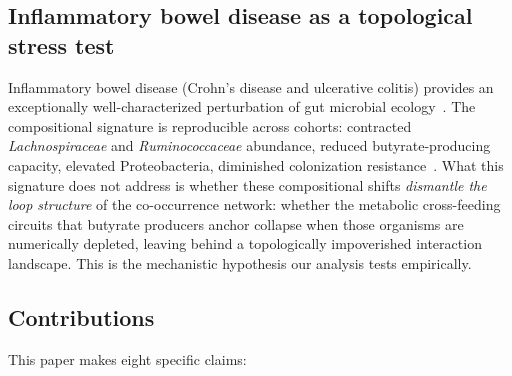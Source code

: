 \subsection{Inflammatory bowel disease as a topological stress test}

Inflammatory bowel disease (Crohn's disease and ulcerative colitis) provides
an exceptionally well-characterized perturbation of
gut microbial ecology~\citep{petersen2014defining}.
The compositional signature is reproducible across cohorts: contracted
\textit{Lachnospiraceae} and \textit{Ruminococcaceae} abundance, reduced
butyrate-producing capacity, elevated Proteobacteria, diminished colonization
resistance~\citep{gevers2014treatment,halfvarson2017dynamics,ley2006microbial}.
What this signature does not address is whether these compositional shifts
\emph{dismantle the loop structure} of the co-occurrence network: whether
the metabolic cross-feeding circuits that butyrate producers anchor collapse
when those organisms are numerically depleted, leaving behind a topologically
impoverished interaction landscape.
This is the mechanistic hypothesis our analysis tests empirically.

\subsection{Contributions}

This paper makes eight specific claims:

